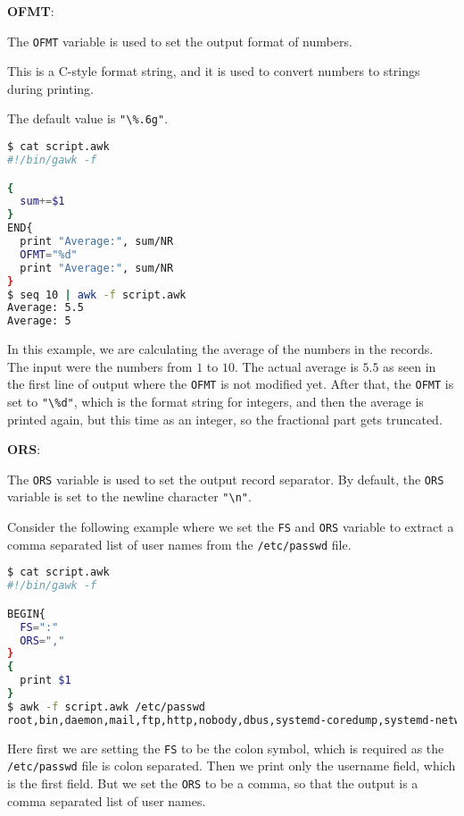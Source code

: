 \textbf{OFMT}:

The \lstinline|OFMT| variable is used to set the output format of numbers.

This is a C-style format string, and it is used to convert numbers to strings during printing.

The default value is \lstinline|"\%.6g"|.

\begin{lstlisting}[language=bash]
$ cat script.awk
#!/bin/gawk -f

{
  sum+=$1
}
END{
  print "Average:", sum/NR
  OFMT="%d"
  print "Average:", sum/NR
}
$ seq 10 | awk -f script.awk
Average: 5.5
Average: 5
\end{lstlisting}

In this example, we are calculating the average of the numbers in the records.
The input were the numbers from $1$ to $10$.
The actual average is $5.5$ as seen in the first line of output where the \lstinline|OFMT| is not modified yet.
After that, the \lstinline|OFMT| is set to \lstinline|"\%d"|, which is the format string for integers, and then the average is printed again, but this time as an integer, so the fractional part gets truncated.

\textbf{ORS}:

The \lstinline|ORS| variable is used to set the output record separator.
By default, the \lstinline|ORS| variable is set to the newline character \lstinline|"\n"|.

Consider the following example where we set the \lstinline|FS| and \lstinline|ORS| variable to extract a comma separated list of user names from the \lstinline|/etc/passwd| file.

\begin{lstlisting}[language=bash]
$ cat script.awk
#!/bin/gawk -f

BEGIN{
  FS=":"
  ORS=","
}
{
  print $1
}
$ awk -f script.awk /etc/passwd
root,bin,daemon,mail,ftp,http,nobody,dbus,systemd-coredump,systemd-network,systemd-oom,systemd-journal-remote,systemd-resolve,systemd-timesync,tss,uuidd,_talkd,avahi,named,cups,dnsmasq,git,nm-openconnect,nm-openvpn,ntp,openvpn,polkitd,rpc,rpcuser,rtkit,saned,sddm,usbmux,sayan,brltty,gluster,qemu,colord,dhcpcd,fwupd,geoclue,libvirt-qemu,mysql,monero,mpd,nbd,passim,postgres,redis,tor,unbound,metabase,test,flatpak,
\end{lstlisting}

Here first we are setting the \lstinline|FS| to be the colon symbol, which is required as the \lstinline|/etc/passwd| file is colon separated.
Then we print only the username field, which is the first field.
But we set the \lstinline|ORS| to be a comma, so that the output is a comma separated list of user names.

